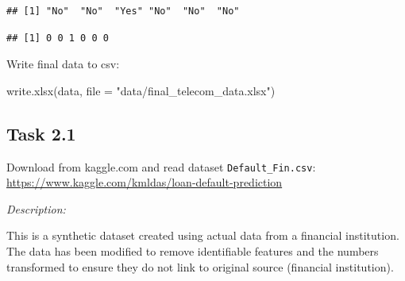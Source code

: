 \documentclass[
]{book}
\newenvironment{Shaded}{\begin{snugshade}}{\end{snugshade}}
\newcommand{\AttributeTok}[1]{\textcolor[rgb]{0.77,0.63,0.00}{#1}}
\newcommand{\DecValTok}[1]{\textcolor[rgb]{0.00,0.00,0.81}{#1}}
\newcommand{\FunctionTok}[1]{\textcolor[rgb]{0.00,0.00,0.00}{#1}}
\newcommand{\NormalTok}[1]{#1}
\newcommand{\OtherTok}[1]{\textcolor[rgb]{0.56,0.35,0.01}{#1}}
\newcommand{\SpecialCharTok}[1]{\textcolor[rgb]{0.00,0.00,0.00}{#1}}
\newcommand{\StringTok}[1]{\textcolor[rgb]{0.31,0.60,0.02}{#1}}
\begin{document}
\begin{Shaded}
\end{Shaded}

\begin{verbatim}
## [1] "No"  "No"  "Yes" "No"  "No"  "No"
\end{verbatim}

\begin{Shaded}
\end{Shaded}

\begin{Shaded}
\end{Shaded}

\begin{verbatim}
## [1] 0 0 1 0 0 0
\end{verbatim}

Write final data to csv:

\begin{Shaded}
\begin{Highlighting}[]
\FunctionTok{write.xlsx}\NormalTok{(data, }\AttributeTok{file =} \StringTok{"data/final\_telecom\_data.xlsx"}\NormalTok{)}
\end{Highlighting}
\end{Shaded}

\hypertarget{chapter441}{%
\subsection{Task 2.1}\label{chapter441}}

Download from kaggle.com and read dataset \texttt{Default\_Fin.csv}:
\url{https://www.kaggle.com/kmldas/loan-default-prediction}

\emph{Description:}

This is a synthetic dataset created using actual data from a financial institution. The data has been modified to remove identifiable features and the numbers transformed to ensure they do not link to original source (financial institution).
\end{document}
